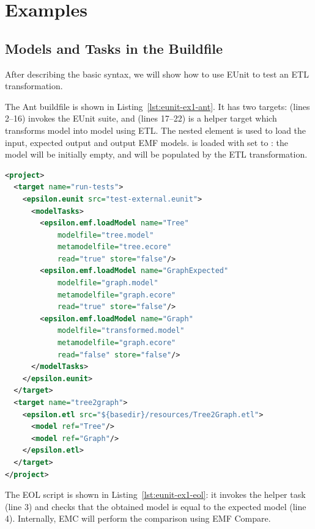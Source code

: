 \section{Examples}
\label{sec:eunit-examples}

\subsection{Models and Tasks in the Buildfile}
\label{sec:eunit-exampl-balanc-ant}

After describing the basic syntax, we will show how to use EUnit to test an ETL transformation.

The Ant buildfile is shown in Listing~\ref{lst:eunit-ex1-ant}. It has two targets:  (lines 2--16) invokes the EUnit suite, and  (lines 17--22) is a helper target which transforms model  into model  using ETL. The  nested element is used to load the input, expected output and output EMF models.  is loaded with  set to : the model will be initially empty, and will be populated by the ETL transformation.

\begin{lstlisting}[language=XML, caption=Ant buildfile for EUnit with \xmlelement{modelTasks} and a helper target, label=lst:eunit-ex1-ant]
<project>
  <target name="run-tests">
    <epsilon.eunit src="test-external.eunit">
      <modelTasks>
        <epsilon.emf.loadModel name="Tree"
            modelfile="tree.model"
            metamodelfile="tree.ecore"
            read="true" store="false"/>
        <epsilon.emf.loadModel name="GraphExpected"
            modelfile="graph.model"
            metamodelfile="graph.ecore"
            read="true" store="false"/>
        <epsilon.emf.loadModel name="Graph"
            modelfile="transformed.model"
            metamodelfile="graph.ecore"
            read="false" store="false"/>
      </modelTasks>
    </epsilon.eunit>
  </target>
  <target name="tree2graph">
    <epsilon.etl src="${basedir}/resources/Tree2Graph.etl">
      <model ref="Tree"/>
      <model ref="Graph"/>
    </epsilon.etl>
  </target>
</project>
\end{lstlisting}

The EOL script is shown in Listing~\ref{lst:eunit-ex1-eol}: it invokes the helper task (line 3) and checks that the obtained model is equal to the expected model (line 4). Internally, EMC will perform the comparison using EMF Compare.

